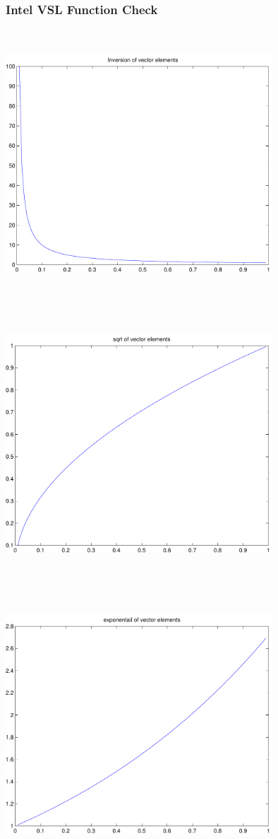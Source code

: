 \documentclass[9pt]{article}
\theoremstyle{plain}
\theoremstyle{definition}
\theoremstyle{remark}
\numberwithin{equation}{section}
\begin{document}
\subsubsection{Intel VSL Function Check}
\includegraphics[width=10.0cm,height=10.0cm]{klVSLInv.pdf}

\includegraphics[width=10.0cm,height=10.0cm]{klVSLSqrt.pdf}

\includegraphics[width=10.0cm,height=10.0cm]{klVSLExp.pdf}
\end{document}

